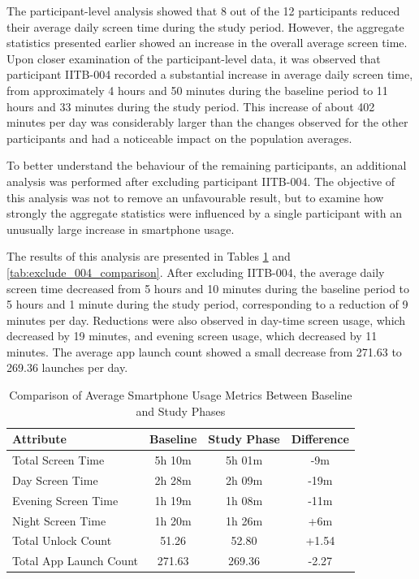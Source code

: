 \documentclass[11pt]{report}
\begin{document}
The participant-level analysis showed that 8 out of the 12 participants reduced 
their average daily screen time during the study period. However, the aggregate 
statistics presented earlier showed an increase in the overall average screen time. 
Upon closer examination of the participant-level data, it was observed that 
participant IITB-004 recorded a substantial increase in average daily screen time, 
from approximately 4 hours and 50 minutes during the baseline period to 11 hours and 
33 minutes during the study period. This increase of about 402 minutes per day was 
considerably larger than the changes observed for the other participants and had a 
noticeable impact on the population averages.

To better understand the behaviour of the remaining participants, an additional 
analysis was performed after excluding participant IITB-004. The objective of this 
analysis was not to remove an unfavourable result, but to examine how strongly the 
aggregate statistics were influenced by a single participant with an unusually large 
increase in smartphone usage.

The results of this analysis are presented in Tables \ref{tab:baseline_study_averages} and \ref{tab:exclude_004_comparison}. 
After excluding IITB-004, the average daily screen time decreased from 5 hours and 
10 minutes during the baseline period to 5 hours and 1 minute during the study 
period, corresponding to a reduction of 9 minutes per day. Reductions were also 
observed in day-time screen usage, which decreased by 19 minutes, and evening screen 
usage, which decreased by 11 minutes. The average app launch count showed a small 
decrease from 271.63 to 269.36 launches per day.

\begin{table}[H]
\centering
\caption{Comparison of Average Smartphone Usage Metrics Between Baseline and Study Phases}
\label{tab:baseline_study_averages}
\begin{tabular}{|l|c|c|c|}
\hline
\textbf{Attribute} &
\textbf{Baseline} &
\textbf{Study Phase} &
\textbf{Difference} \\
\hline

Total Screen Time &
5h 10m &
5h 01m &
-9m \\
\hline

Day Screen Time &
2h 28m &
2h 09m &
-19m \\
\hline

Evening Screen Time &
1h 19m &
1h 08m &
-11m \\
\hline

Night Screen Time &
1h 20m &
1h 26m &
+6m \\
\hline

Total Unlock Count &
51.26 &
52.80 &
+1.54 \\
\hline

Total App Launch Count &
271.63 &
269.36 &
-2.27 \\
\hline

\end{tabular}
\end{table}
\end{document}

